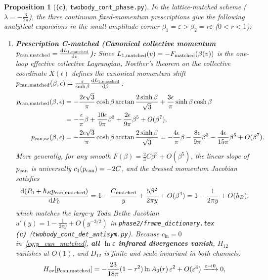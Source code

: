 \documentclass[11pt,a4paper]{article}
\newcommand{\Lc}{\textbf{(c)}}
\newcommand{\script}[1]{\texttt{#1}}
\newcommand{\dd}{\mathrm{d}}
\newtheorem{proposition}{Proposition}[section]
\begin{document}
\begin{proposition}[\Lc, \script{twobody\_cont\_phase.py}]\label{prop:three_prescriptions}
In the lattice-matched scheme ($\lambda=-\frac{3}{2\pi}$), the three continuum fixed-momentum prescriptions give the following analytical expansions in the small-amplitude corner $\beta_1=\varepsilon>\beta_2=r\varepsilon$ ($0<r<1$):
\begin{enumerate}
\item \textbf{Prescription C-matched (Canonical collective momentum $p_{\rm can,matched}=\frac{\dd L_{1,\rm matched}}{\dd v}$):}
Since $L_{1,\rm matched}(v)=-F_{\rm matched}(\beta(v))$ is the one-loop effective collective Lagrangian, Noether's theorem on the collective coordinate $X(t)$ defines the canonical momentum shift $p_{\rm can,matched}(\beta,\epsilon)=\frac{\epsilon}{\sinh\beta}\frac{\dd L_{1,\rm matched}}{\dd\beta}$:
\begin{align}
p_{\rm can,matched}(\beta,\epsilon)&=-\frac{2\epsilon\sqrt3}{\pi}\cosh\beta\arctan\frac{2\sinh\beta}{\sqrt3}+\frac{3\epsilon}{\pi}\sinh\beta\cosh\beta\nonumber\\
&=-\frac{\epsilon}{\pi}\beta+\frac{10\epsilon}{9\pi}\beta^3+\frac{2\epsilon}{9\pi}\beta^5+O(\beta^7),\label{eq:p_can_matched}\\
p_{\rm can,ac}(\beta,\epsilon)&=-\frac{2\epsilon\sqrt3}{\pi}\cosh\beta\arctan\frac{2\sinh\beta}{\sqrt3}
=-\frac{4\epsilon}{\pi}\beta-\frac{8\epsilon}{9\pi}\beta^3-\frac{4\epsilon}{15\pi}\beta^5+O(\beta^7).\label{eq:p_can_ac}
\end{align}
More generally, for any smooth $F(\beta)=\frac23 C\beta^3+O(\beta^5)$, the linear slope of $p_{\rm can}$ is universally $c_1(p_{\rm can})=-2C$, and the dressed momentum Jacobian satisfies
\begin{equation}\label{eq:jac_matched}
\frac{\dd(P_0+\hbar_B p_{\rm can,matched})}{\dd P_0}
=1-\frac{C_{\rm matched}}{y}+\frac{5\beta^2}{2\pi y}+O(\beta^4)
=1-\frac{1}{2\pi y}+O(\hbar_B),
\end{equation}
which matches the large-$y$ Toda Bethe Jacobian $u'(y)=1-\frac{1}{2\pi y}+O(y^{-3/2})$ in \texttt{phase2/frame\_dictionary.tex} \Lc\ (\script{twobody\_cont\_det\_antisym.py}). Because $c_{\ln}=0$ in~\eqref{eq:p_can_matched}, \textbf{all $\ln\varepsilon$ infrared divergences vanish}, $H_{12}$ vanishes at $O(1)$, and $D_{12}$ is finite and scale-invariant in both channels:
\begin{align}
H_{\rm ov}[p_{\rm can,matched}]&=-\frac{23}{18\pi}(1-r^2)\ln A_0(r)\,\varepsilon^2+O(\varepsilon^4)\xrightarrow{\varepsilon\to 0}0,\label{eq:H_ov_can_m}\\

\end{align}
\end{enumerate}
\end{proposition}
\end{document}
